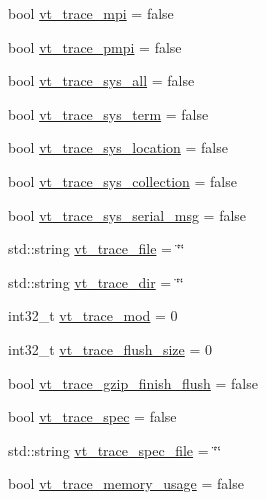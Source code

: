 \begin{DoxyCompactItemize}
\item 
bool \hyperlink{structvt_1_1arguments_1_1_app_config_a76934e4c1a8c3b9b1eedaf87977330ec}{vt\+\_\+trace\+\_\+mpi} = false
\item 
bool \hyperlink{structvt_1_1arguments_1_1_app_config_a68a2d29db4c6ebd4ca3cc0141cf151d4}{vt\+\_\+trace\+\_\+pmpi} = false
\item 
bool \hyperlink{structvt_1_1arguments_1_1_app_config_a97d8aa275d3c1368d347bb9e88e1abe0}{vt\+\_\+trace\+\_\+sys\+\_\+all} = false
\item 
bool \hyperlink{structvt_1_1arguments_1_1_app_config_a723e9f8cd1422d47d0294dcb951261f7}{vt\+\_\+trace\+\_\+sys\+\_\+term} = false
\item 
bool \hyperlink{structvt_1_1arguments_1_1_app_config_a91260efaad41abe7d191ba4771b45785}{vt\+\_\+trace\+\_\+sys\+\_\+location} = false
\item 
bool \hyperlink{structvt_1_1arguments_1_1_app_config_a50becf5c6101368f5d9c6884e190fed3}{vt\+\_\+trace\+\_\+sys\+\_\+collection} = false
\item 
bool \hyperlink{structvt_1_1arguments_1_1_app_config_a50afef339e662908db55e0d60bde2d40}{vt\+\_\+trace\+\_\+sys\+\_\+serial\+\_\+msg} = false
\item 
std\+::string \hyperlink{structvt_1_1arguments_1_1_app_config_ad445cf8321e97a3e5da0fa7923690fa8}{vt\+\_\+trace\+\_\+file} = \char`\"{}\char`\"{}
\item 
std\+::string \hyperlink{structvt_1_1arguments_1_1_app_config_a05efd2295aa43237c029cc2b24f0e788}{vt\+\_\+trace\+\_\+dir} = \char`\"{}\char`\"{}
\item 
int32\+\_\+t \hyperlink{structvt_1_1arguments_1_1_app_config_afa2e36bf17ed46ca812263f523533353}{vt\+\_\+trace\+\_\+mod} = 0
\item 
int32\+\_\+t \hyperlink{structvt_1_1arguments_1_1_app_config_a537883e43e43508431626e90886edd92}{vt\+\_\+trace\+\_\+flush\+\_\+size} = 0
\item 
bool \hyperlink{structvt_1_1arguments_1_1_app_config_acbb68fc6506646d49bb061156e9df0ff}{vt\+\_\+trace\+\_\+gzip\+\_\+finish\+\_\+flush} = false
\item 
bool \hyperlink{structvt_1_1arguments_1_1_app_config_ade1d955e557ed03865dbb4317bb69c22}{vt\+\_\+trace\+\_\+spec} = false
\item 
std\+::string \hyperlink{structvt_1_1arguments_1_1_app_config_abd5bcb7a9ca53be8eafc28e2cbd18290}{vt\+\_\+trace\+\_\+spec\+\_\+file} = \char`\"{}\char`\"{}
\item 
bool \hyperlink{structvt_1_1arguments_1_1_app_config_a39c140474cc43ea0d8bca36359ffd86a}{vt\+\_\+trace\+\_\+memory\+\_\+usage} = false

\end{DoxyCompactItemize}
